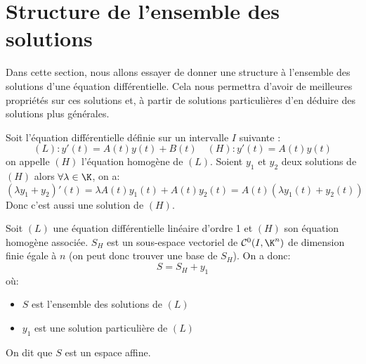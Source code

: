 
\section{Structure de l'ensemble des solutions}

Dans cette section, nous allons essayer de donner une structure à 
l'ensemble des solutions d'une équation différentielle. Cela nous 
permettra d'avoir de meilleures propriétés sur ces solutions et, à partir 
de solutions particulières d'en déduire des solutions plus générales. 

\vspace{0.5cm} 

Soit l'équation différentielle définie sur un intervalle $I$ suivante :
	\[ (L) : y'(t) = A(t) y(t) + B(t) \quad (H) : y'(t) = A(t)y(t) \] 
on appelle $(H)$ l'équation homogène de $(L)$. 
Soient $y_1$ et $y_2$ deux solutions de $(H)$ alors $ \forall \lambda \in \K$, on a: 
	\[ (\lambda y_1 + y_2)'(t) = \lambda A(t)y_1(t) + A(t) y_2(t) = A(t) (\lambda y_1(t) + y_2(t)) \]
Donc c'est aussi une solution de $(H)$. 

\newpage

\begin{theorem}[Structure]
	Soit $(L)$ une équation différentielle linéaire d'ordre 1 et $(H)$ 
	son équation homogène associée. 
	$S_H$ est un sous-espace vectoriel de $ \mathcal{C}^0(I, \K^n)$ de dimension finie 
	égale à $n$ (on peut donc trouver une base de $S_H$). On a donc: 
		\[ \boxed{ S = S_H + y_1 } \]
	où: 
	\begin{itemize} 
		\item $S$ est l'ensemble des solutions de $(L)$
		\item $y_1$ est une solution particulière de $(L)$
	\end{itemize}
	On dit que $S$ est un espace affine. 
\end{theorem}

